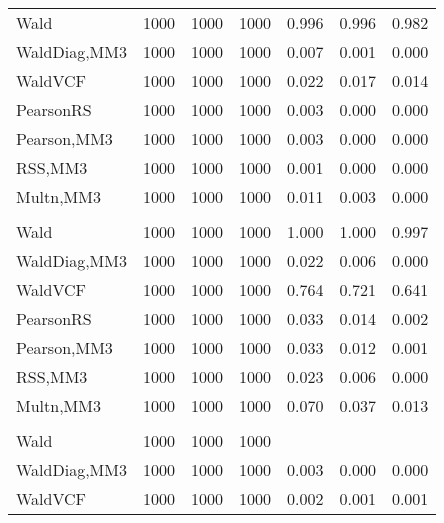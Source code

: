 \documentclass[
]{article}
\begin{document}
\begin{table}[H]
{\begin{tabular}[t]{lrrrrrr}
\hspace{1em}Wald & 1000 & 1000 & 1000 & 0.996 & 0.996 & 0.982\\
\hspace{1em}WaldDiag,MM3 & 1000 & 1000 & 1000 & 0.007 & 0.001 & 0.000\\
\hspace{1em}WaldVCF & 1000 & 1000 & 1000 & 0.022 & 0.017 & 0.014\\
\hspace{1em}PearsonRS & 1000 & 1000 & 1000 & 0.003 & 0.000 & 0.000\\
\hspace{1em}Pearson,MM3 & 1000 & 1000 & 1000 & 0.003 & 0.000 & 0.000\\
\hspace{1em}RSS,MM3 & 1000 & 1000 & 1000 & 0.001 & 0.000 & 0.000\\
\hspace{1em}Multn,MM3 & 1000 & 1000 & 1000 & 0.011 & 0.003 & 0.000\\
\addlinespace[0.3em]
\multicolumn{7}{l}{\textbf{2F 10V}}\\
\hspace{1em}Wald & 1000 & 1000 & 1000 & 1.000 & 1.000 & 0.997\\
\hspace{1em}WaldDiag,MM3 & 1000 & 1000 & 1000 & 0.022 & 0.006 & 0.000\\
\hspace{1em}WaldVCF & 1000 & 1000 & 1000 & 0.764 & 0.721 & 0.641\\
\hspace{1em}PearsonRS & 1000 & 1000 & 1000 & 0.033 & 0.014 & 0.002\\
\hspace{1em}Pearson,MM3 & 1000 & 1000 & 1000 & 0.033 & 0.012 & 0.001\\
\hspace{1em}RSS,MM3 & 1000 & 1000 & 1000 & 0.023 & 0.006 & 0.000\\
\hspace{1em}Multn,MM3 & 1000 & 1000 & 1000 & 0.070 & 0.037 & 0.013\\
\addlinespace[0.3em]
\multicolumn{7}{l}{\textbf{3F 15V}}\\
\hspace{1em}Wald & 1000 & 1000 & 1000 &  &  & \\
\hspace{1em}WaldDiag,MM3 & 1000 & 1000 & 1000 & 0.003 & 0.000 & 0.000\\
\hspace{1em}WaldVCF & 1000 & 1000 & 1000 & 0.002 & 0.001 & 0.001\\

\end{tabular}}
\end{table}
\end{document}
